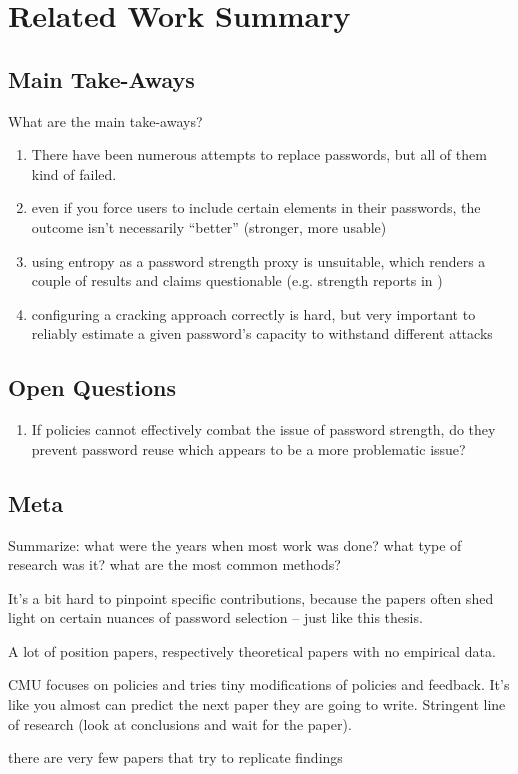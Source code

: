 
\chapter[Related Work Summary]{Related Work Summary}\label{chap:rw:summary}


\section{Main Take-Aways}
What are the main take-aways?

\begin{enumerate}
	\item There have been numerous attempts to replace passwords, but all of them kind of failed.
	\item even if you force users to include certain elements in their passwords, the outcome isn't necessarily ``better'' (stronger, more usable)
	\item using entropy as a password strength proxy is unsuitable, which renders a couple of results and claims questionable (e.g. strength reports in \cite{Florencio2007LargeScaleStudyPasswordHabits})
	\item configuring a cracking approach correctly is hard, but very important to reliably estimate a given password's capacity to withstand different attacks \cite{Bonneau2012ScienceOfGuessing, Kelley2012GuessAgain, Ur2015MeasuringRealWorldAccuracies, Weir2009PCFG}
\end{enumerate}

\section{Open Questions}
\begin{enumerate}
\item If policies cannot effectively combat the issue of password strength, do they prevent password reuse which appears to be a more problematic issue? 
\end{enumerate}

\section{Meta}

Summarize: what were the years when most work was done? what type of research was it? what are the most common methods?

It's a bit hard to pinpoint specific contributions, because the papers often shed light on certain nuances of password selection -- just like this thesis.

A lot of position papers, respectively theoretical papers with no empirical data.

CMU focuses on policies and tries tiny modifications of policies and feedback. It's like you almost can predict the next paper they are going to write. Stringent line of research (look at conclusions and wait for the paper).


there are very few papers that try to replicate findings


